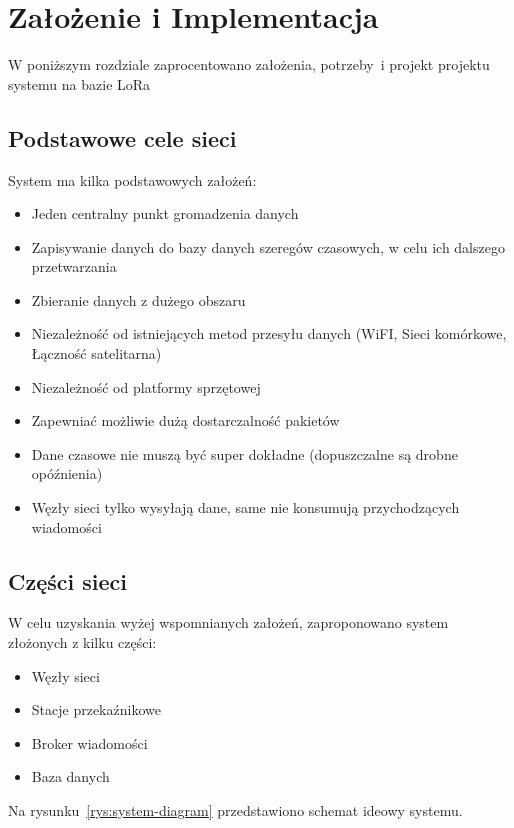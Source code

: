 \chapter{Założenie i Implementacja}
W poniższym rozdziale zaprocentowano założenia, potrzeby~i projekt projektu systemu na bazie LoRa

\section{Podstawowe cele sieci}
System ma kilka podstawowych założeń:
\begin{itemize}
    \item Jeden centralny punkt gromadzenia danych
    \item Zapisywanie danych do bazy danych szeregów czasowych, w celu ich dalszego przetwarzania
    \item Zbieranie danych z dużego obszaru
    \item Niezależność od istniejących metod przesyłu danych (WiFI, Sieci komórkowe, Łączność satelitarna)
    \item Niezależność od platformy sprzętowej
    \item Zapewniać możliwie dużą dostarczalność pakietów
    \item Dane czasowe nie muszą być super dokładne (dopuszczalne są drobne opóźnienia)
    \item Węzły sieci tylko wysyłają dane, same nie konsumują przychodzących wiadomości
\end{itemize}

\section{Części sieci}
W celu uzyskania wyżej wspomnianych założeń, zaproponowano system złożonych z kilku części:
\begin{itemize}
    \item Węzły sieci
    \item Stacje przekaźnikowe
    \item Broker wiadomości
    \item Baza danych
\end{itemize}
Na rysunku~\ref{rys:system-diagram} przedstawiono schemat ideowy systemu.

